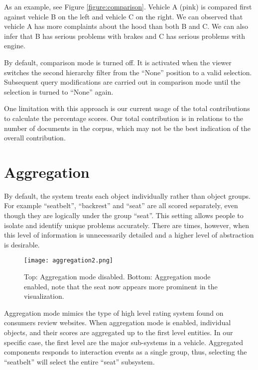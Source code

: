 
As an example, see Figure \ref{figure:comparison}. Vehicle A (pink) is compared
first against vehicle B on the left and vehicle C on the right. We can observed
that vehicle A has more complaints about the hood than both B and C. We can also
infer that B has serious problems with brakes and C has serious problems with
engine.
 
By default, comparison mode is turned off. It is activated when the viewer
switches the second hierarchy filter from the ``None'' position to a valid
selection. Subsequent query modifications are carried out in comparison mode
until the selection is turned to ``None'' again.

One limitation with this approach is our current usage of the total
contributions to calculate the percentage scores. Our total contribution is in
relations to the number of documents in the corpus, which may not be
the best indication of the overall contribution.

 
 
 
\section{Aggregation}
By default, the system treats each object individually rather than object
groups. For example ``seatbelt'', ``backrest'' and ``seat'' are all scored
separately, even though they are logically under the group ``seat''. This
setting allows people to isolate and identify unique problems accurately. There
are times, however, when this level of information is unnecessarily detailed and
a higher level of abstraction is desirable.

	\begin{figure}
	 \centering  
	 \texttt{[image: aggregation2.png]}
	 \caption[Aggregation View]{Top: Aggregation mode disabled. Bottom: Aggregation
	 mode enabled, note that the seat now appears more prominent in the visualization.}
	 \label{figure:aggregation}
	\end{figure}
	
Aggregation mode mimics the type of high level rating system found on consumers
review websites. When aggregation mode is enabled, individual objects, and their
scores are aggregated up to the first level entities. In our specific case, the 
first level are the major sub-systems in a vehicle. Aggregated components
responds to interaction events as a single group, thus, selecting the
``seatbelt'' will select the entire ``seat'' subsystem.

